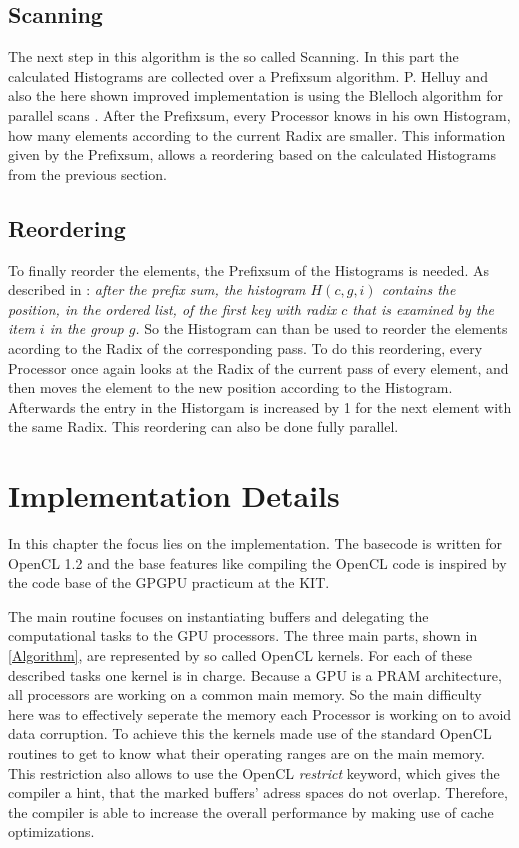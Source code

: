 \documentclass{llncs}
\begin{document}
\subsection{Scanning}
The next step in this algorithm is the so called Scanning. In this part the calculated Histograms are collected over a Prefixsum algorithm. P. Helluy \cite{ocl-radix-helluy} and also the here shown improved implementation is using the Blelloch algorithm for parallel scans \cite{blelloch1989scans}. After the Prefixsum, every Processor knows in his own Histogram, how many elements according to the current Radix are smaller. This information given by the Prefixsum, allows a reordering based on the calculated Histograms from the previous section.

\subsection{Reordering}
To finally reorder the elements, the Prefixsum of the Histograms is needed. As described in \cite{ocl-radix-helluy}: \textit{after the prefix sum, the histogram $H(c, g, i)$ contains the position, in the ordered list, of the first key with radix $c$ that is examined by the item $i$ in the group $g$.} So the Histogram can than be used to reorder the elements acording to the Radix of the corresponding pass. To do this reordering, every Processor once again looks at the Radix of the current pass of every element, and then moves the element to the new position according to the Histogram. Afterwards the entry in the Historgam is increased by 1 for the next element with the same Radix. This reordering can also be done fully parallel.

\newpage
\section{Implementation Details}
In this chapter the focus lies on the implementation. The basecode is written for OpenCL 1.2 and the base features like compiling the OpenCL code is inspired by the code base of the GPGPU practicum at the KIT.

The main routine focuses on instantiating buffers and delegating the computational tasks to the GPU processors. The three main parts, shown in \ref{Algorithm}, are represented by so called OpenCL kernels. For each of these described tasks one kernel is in charge. Because a GPU is a PRAM architecture, all processors are working on a common main memory. So the main difficulty here was to effectively seperate the memory each Processor is working on to avoid data corruption. To achieve this the kernels made use of the standard OpenCL routines to get to know what their operating ranges are on the main memory. This restriction also allows to use the OpenCL \textit{restrict} keyword, which gives the compiler a hint, that the marked buffers' adress spaces do not overlap. Therefore, the compiler is able to increase the overall performance by making use of cache optimizations.
\end{document}
